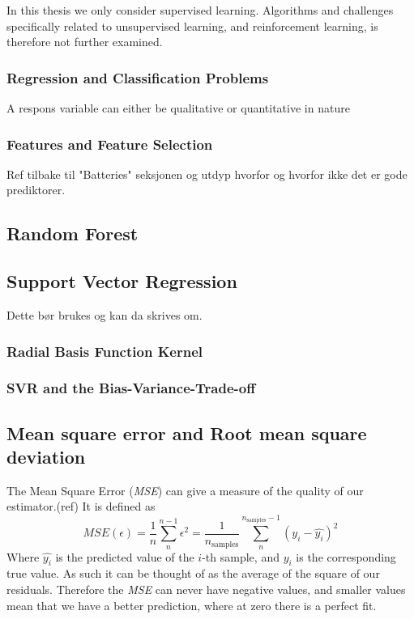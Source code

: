 	In this thesis we only consider supervised learning. Algorithms and challenges specifically related to unsupervised learning, and reinforcement learning, is therefore not further examined. 

	\subsubsection{Regression and Classification Problems}
	A respons variable can either be qualitative or quantitative in nature 
	
	\subsubsection{Features and Feature Selection}
	\par
	Ref tilbake til "Batteries" seksjonen og utdyp hvorfor og hvorfor ikke det er gode prediktorer. 
	
\subsection{Random Forest}
	
\subsection{Support Vector Regression}

	Dette bør brukes og kan da skrives om.
	\subsubsection{Radial Basis Function Kernel}
	\subsubsection{SVR and the Bias-Variance-Trade-off}
	

\subsection{Mean square error and Root mean square deviation}
The Mean Square Error (\textit{MSE}) can give a measure of the quality of our estimator.(ref) It is defined as
\begin{equation}\label{eq: mse}
	\textit{MSE}(\epsilon) = \frac{1}{n}\sum_n^{n-1}\epsilon^2 = \frac{1}{n_\text{samples}} \sum_n^{n_{\text{samples}}-1}(y_i - \hat{y_i})^2
	\end{equation}
	Where $\hat{y_i}$ is the predicted value of the $i$-th sample, and $y_i$ is the corresponding true value.
As such it can be thought of  as the average of the square of our residuals. Therefore the \textit{MSE} can never have negative values, and smaller values mean that we have a better prediction, where at zero there is a perfect fit.

